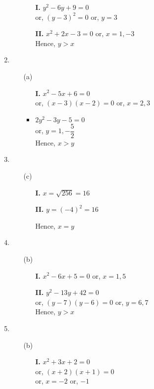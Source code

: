 \begin{multicols}{2}
\begin{enumerate}
\begin{itemize}
    \begin{itemize}
    \item[{\bf I.}] $y^2 - 6y + 9 = 0$\\
      or, $(y - 3)^2 = 0$ or, $y = 3$
    \item[{\bf II.}] $x^2 + 2x - 3 = 0$ or, $x = 1, -3$\\
      Hence, $y > x$
      \end{itemize}
  \end{itemize}
\item
  \begin{itemize}
  \item[(a)]
    \begin{itemize}
    \item[{\bf I.}] $x^2 - 5x + 6 = 0$\\
      or, $(x - 3)(x - 2) = 0$ or, $x = 2, 3$
    \item $2y^2 - 3y - 5 = 0$\\
      or, $y = 1, -\dfrac{5}{2}$\\
      Hence, $x > y$
      \end{itemize}
    \end{itemize}
\item
  \begin{itemize}
  \item[(c)]
    \begin{itemize}
    \item[{\bf I.}] $x = \sqrt{256} = 16$
    \item[{\bf II.}] $y = (-4)^2 = 16$

      Hence, $x = y$
      \end{itemize}
  \end{itemize}
\item
  \begin{itemize}
  \item[(b)]
    \begin{itemize}
    \item[{\bf I.}] $x^2 - 6x + 5 = 0$ or, $x = 1, 5$
    \item[{\bf II.}] $y^2 - 13y + 42 = 0$\\
      or, $(y - 7)(y - 6) = 0$ or, $y = 6, 7$\\
      Hence, $y > x$
      \end{itemize}
  \end{itemize}
\item
  \begin{itemize}
  \item[(b)]
    \begin{itemize}
    \item[{\bf I.}] $x^2 + 3x + 2 = 0$\\
      or, $(x + 2)(x + 1) = 0$\\
      or, $x = -2$ or, $-1$


\end{itemize}
\end{itemize}
\end{enumerate}
\end{multicols}

